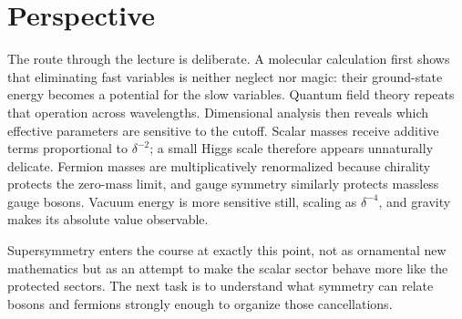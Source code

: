 \begin{classroomqa}
\end{classroomqa}

\begin{classroomqa}
\end{classroomqa}

\section{Perspective}

The route through the lecture is deliberate. A molecular calculation first
shows that eliminating fast variables is neither neglect nor magic: their
ground-state energy becomes a potential for the slow variables. Quantum
field theory repeats that operation across wavelengths. Dimensional analysis
then reveals which effective parameters are sensitive to the cutoff. Scalar
masses receive additive terms proportional to \(\delta^{-2}\); a small Higgs
scale therefore appears unnaturally delicate. Fermion masses are
multiplicatively renormalized because chirality protects the zero-mass limit,
and gauge symmetry similarly protects massless gauge bosons. Vacuum energy
is more sensitive still, scaling as \(\delta^{-4}\), and gravity makes its
absolute value observable.

Supersymmetry enters the course at exactly this point, not as ornamental new
mathematics but as an attempt to make the scalar sector behave more like the
protected sectors. The next task is to understand what symmetry can relate
bosons and fermions strongly enough to organize those cancellations.
